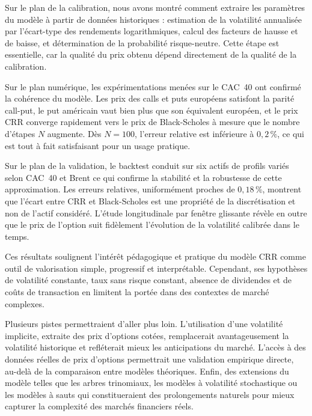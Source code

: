 \documentclass[11pt]{report}
\begin{document}
Sur le plan de la calibration, nous avons montré comment extraire les paramètres du modèle à partir de données historiques : estimation de la volatilité annualisée par l'écart-type des rendements logarithmiques, calcul des facteurs de hausse et de baisse, et détermination de la probabilité risque-neutre. Cette étape est essentielle, car la qualité du prix obtenu dépend directement de la qualité de la calibration.

Sur le plan numérique, les expérimentations menées sur le CAC~40 ont confirmé la cohérence du modèle. Les prix des calls et puts européens satisfont la parité call-put, le put américain vaut bien plus que son équivalent européen, et le prix CRR converge rapidement vers le prix de Black-Scholes à mesure que le nombre d'étapes $N$ augmente. Dès $N = 100$, l'erreur relative est inférieure à $0{,}2\,\%$, ce qui est tout à fait satisfaisant pour un usage pratique.

Sur le plan de la validation, le backtest conduit sur six actifs de profils variés selon CAC~40 et Brent ce qui confirme la stabilité et la robustesse de cette approximation. Les erreurs relatives, uniformément proches de $0{,}18\,\%$, montrent que l'écart entre CRR et Black-Scholes est une propriété de la discrétisation et non de l'actif considéré. L'étude longitudinale par fenêtre glissante révèle en outre que le prix de l'option suit fidèlement l'évolution de la volatilité calibrée dans le temps.

Ces résultats soulignent l'intérêt pédagogique et pratique du modèle CRR comme outil de valorisation simple, progressif et interprétable. Cependant, ses hypothèses de volatilité constante, taux sans risque constant, absence de dividendes et de coûts de transaction en limitent la portée dans des contextes de marché complexes.

Plusieurs pistes permettraient d'aller plus loin. L'utilisation d'une volatilité implicite, extraite des prix d'options cotées, remplacerait avantageusement la volatilité historique et refléterait mieux les anticipations du marché. L'accès à des données réelles de prix d'options permettrait une validation empirique directe, au-delà de la comparaison entre modèles théoriques. Enfin, des extensions du modèle telles que les arbres trinomiaux, les modèles à volatilité stochastique ou les modèles à sauts qui constitueraient des prolongements naturels pour mieux capturer la complexité des marchés financiers réels.

\newpage

\end{document}
